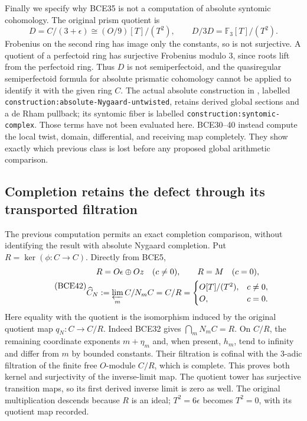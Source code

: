 Finally we specify why BCE35 is not a computation of
absolute syntomic cohomology. The original prism quotient is
\begin{equation}\tag{BCE41}
D=C/(3+\epsilon)\cong(O/9)[T]/(T^2),\qquad
D/3D=\mathbb F_3[T]/(T^2).
\end{equation}
Frobenius on the second ring has image only the constants,
so is not surjective. A quotient of a perfectoid ring has
surjective Frobenius modulo \(3\), since roots lift from
the perfectoid ring. Thus \(D\) is not semiperfectoid,
and the quasiregular semiperfectoid formula for absolute
prismatic cohomology cannot be applied to identify it with
the given ring \(C\).
The actual absolute construction in \cite{BCEBL}, labelled
\texttt{construction:absolute-Nygaard-untwisted}, retains
derived global sections and a de Rham pullback; its syntomic
fiber is labelled \texttt{construction:syntomic-complex}.
Those terms have not been evaluated here. BCE30--40 instead
compute the local twist, domain, differential, and receiving
map completely. They show exactly which previous class is
lost before any proposed global arithmetic comparison.

\subsection{Completion retains the defect through its transported filtration}

The previous computation permits an exact completion comparison,
without identifying the result with absolute Nygaard completion.
Put \(R=\ker(\phi:C\to C)\). Directly from BCE5,
\begin{equation}\tag{BCE42}
\begin{gathered}
R=O\epsilon\oplus Oz\quad(c\ne0),\qquad R=M\quad(c=0),\\
\widehat C_N:=\varprojlim_m C/N_mC=C/R
=\begin{cases}O[T]/(T^2),&c\ne0,\\O,&c=0.\end{cases}
\end{gathered}
\end{equation}
Here equality with the quotient is the isomorphism induced by
the original quotient map \(q_N:C\to C/R\).
Indeed BCE32 gives \(\bigcap_mN_mC=R\). On \(C/R\),
the remaining coordinate exponents \(m+\eta_m\) and,
when present, \(h_m\), tend to infinity and differ from
\(m\) by bounded constants. Their filtration is cofinal
with the \(3\)-adic filtration of the finite free \(O\)-module
\(C/R\), which is complete. This proves both kernel and
surjectivity of the inverse-limit map. The quotient tower
has surjective transition maps, so its first derived
inverse limit is zero as well. The original multiplication
descends because \(R\) is an ideal; \(T^2=6\epsilon\)
becomes \(T^2=0\), with its quotient map recorded.

